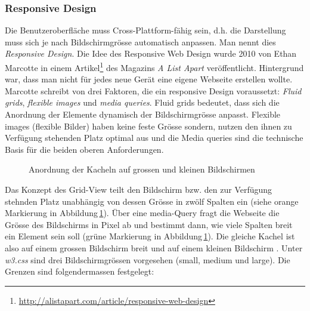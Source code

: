 \subsubsection{Responsive Design}
\label{subsec:responsiveFactors}
Die Benutzeroberfläche muss Cross-Plattform-fähig sein, d.h. die Darstellung muss sich je nach Bildschirmgrösse automatisch anpassen. Man nennt dies \textit{Responsive Design}. Die Idee des Responsive Web Design wurde 2010 von Ethan Marcotte in einem Artikel\footnote{ \url{http://alistapart.com/article/responsive-web-design}} des Magazins \textit{A List Apart} veröffentlicht. Hintergrund war, dass man nicht für jedes neue Gerät eine eigene Webseite erstellen wollte. Marcotte schreibt von drei Faktoren, die ein responsive Design voraussetzt: \textit{Fluid grids}, \textit{flexible images} und \textit{media queries}. Fluid grids bedeutet, dass sich die Anordnung der Elemente dynamisch der Bildschirmgrösse anpasst. Flexible images (flexible Bilder) haben keine feste Grösse sondern, nutzen den ihnen zu Verfügung stehenden Platz optimal aus und die Media queries sind die technische Basis für die beiden oberen Anforderungen.

\begin{figure}[h!]
	\centering
	\caption{Anordnung der Kacheln auf grossen und kleinen Bildschirmen}
	\label{img:kacheln2}
\end{figure}

\noindent
Das Konzept des Grid-View teilt den Bildschirm bzw. den zur Verfügung stehnden Platz unabhängig von dessen Grösse in zwölf Spalten ein (siehe orange Markierung in Abbildung\,\ref{img:kacheln2}). Über eine media-Query fragt die Webseite die Grösse des Bildschirms in Pixel ab und bestimmt dann, wie viele Spalten breit ein Element sein soll (grüne Markierung in Abbildung\,\ref{img:kacheln2}). Die gleiche Kachel ist also auf einem grossen Bildschirm   breit und auf einem kleinen Bildschirm . Unter \emph{w3.css} sind drei Bildschirmgrössen vorgesehen (small, medium und large). Die Grenzen sind folgendermassen festgelegt:

